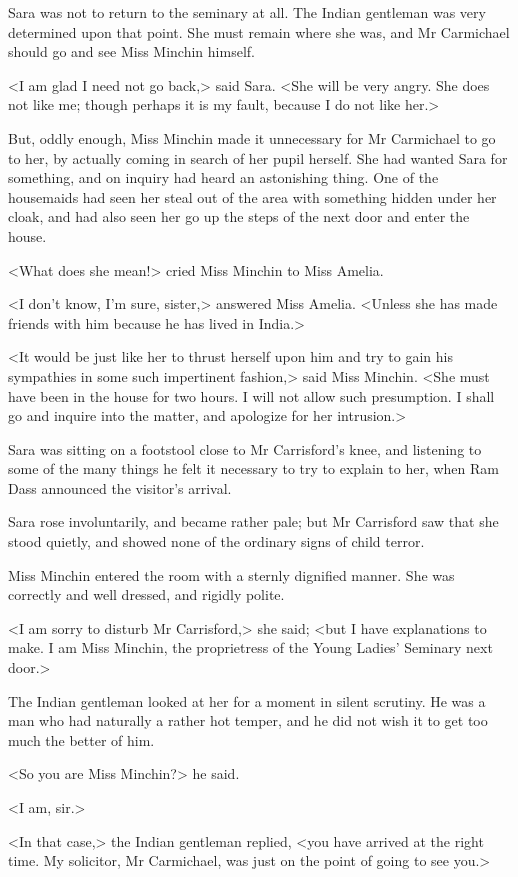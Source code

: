 Sara was not to return to the seminary at all. The Indian gentleman was very determined upon that point. She must remain where she was, and Mr Carmichael should go and see Miss Minchin himself.

<I am glad I need not go back,> said Sara. <She will be very angry. She does not like me; though perhaps it is my fault, because I do not like her.>

But, oddly enough, Miss Minchin made it unnecessary for Mr Carmichael to go to her, by actually coming in search of her pupil herself. She had wanted Sara for something, and on inquiry had heard an astonishing thing. One of the housemaids had seen her steal out of the area with something hidden under her cloak, and had also seen her go up the steps of the next door and enter the house.

<What does she mean!> cried Miss Minchin to Miss Amelia.

<I don't know, I'm sure, sister,> answered Miss Amelia. <Unless she has made friends with him because he has lived in India.>

<It would be just like her to thrust herself upon him and try to gain his sympathies in some such impertinent fashion,> said Miss Minchin. <She must have been in the house for two hours. I will not allow such presumption. I shall go and inquire into the matter, and apologize for her intrusion.>

Sara was sitting on a footstool close to Mr Carrisford's knee, and listening to some of the many things he felt it necessary to try to explain to her, when Ram Dass announced the visitor's arrival.

Sara rose involuntarily, and became rather pale; but Mr Carrisford saw that she stood quietly, and showed none of the ordinary signs of child terror.

Miss Minchin entered the room with a sternly dignified manner. She was correctly and well dressed, and rigidly polite.

<I am sorry to disturb Mr Carrisford,> she said; <but I have explanations to make. I am Miss Minchin, the proprietress of the Young Ladies' Seminary next door.>

The Indian gentleman looked at her for a moment in silent scrutiny. He was a man who had naturally a rather hot temper, and he did not wish it to get too much the better of him.

<So you are Miss Minchin?> he said.

<I am, sir.>

<In that case,> the Indian gentleman replied, <you have arrived at the right time. My solicitor, Mr Carmichael, was just on the point of going to see you.>

